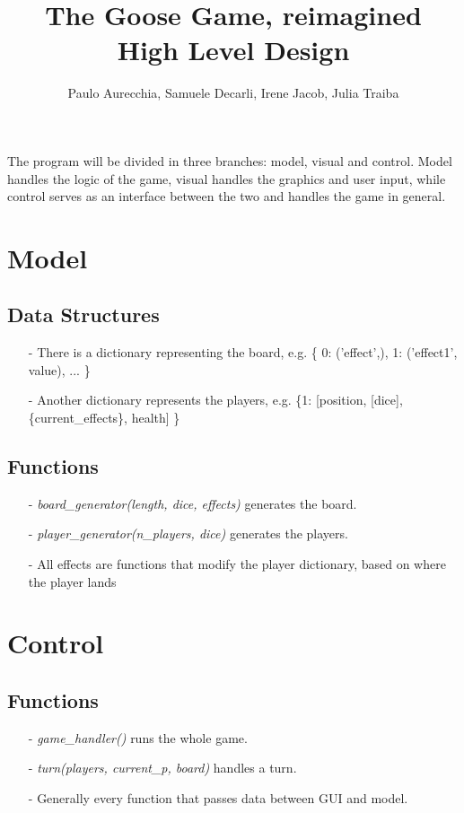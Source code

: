 \documentclass[11pt]{article}
\title{\textbf{The Goose Game, reimagined}\\High Level Design}
\author{Paulo Aurecchia, Samuele Decarli, Irene Jacob, Julia Traiba}
\date{}
\begin{document}
\maketitle
\thispagestyle{fancy}
\noindent The program will be divided in three branches: model, visual and control. Model handles the logic of the game, visual handles the graphics and user input, while control serves as an interface between the two and handles the game in general.\\

\section*{Model}
\subsection*{Data Structures}
\begin{itemize}
	\item [-] There is a dictionary representing the board, e.g. \{ 0: ('effect',), 1: ('effect1', value), ... \}
	\item [-] Another dictionary represents the players, e.g. \{1: [position, [dice], \{current\_effects\}, health] \}
\end{itemize}

\subsection*{Functions}
\begin{itemize}
	\item [-] \textit{board\_generator(length, dice, effects)} generates the board.
	\item [-] \textit{player\_generator(n\_players, dice)} generates the players.
	\item [-] All effects are functions that modify the player dictionary, based on where the player lands
\end{itemize}

\pagebreak

\section*{Control}
\subsection*{Functions}
\begin{itemize}
	\item [-] \textit{game\_handler()} runs the whole game.
	\item [-] \textit{turn(players, current\_p, board)} handles a turn.
	\item [-] Generally every function that passes data between GUI and model. 
\end{itemize}
\end{document}
